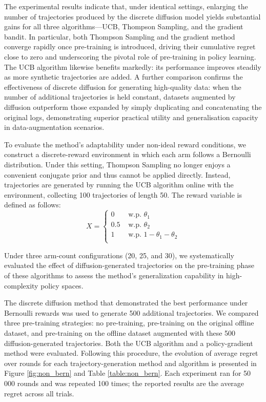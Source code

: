 

The experimental results indicate that, under identical settings, enlarging the number of trajectories produced by the discrete diffusion model yields substantial gains for all three algorithms—UCB, Thompson Sampling, and the gradient bandit. In particular, both Thompson Sampling and the gradient method converge rapidly once pre-training is introduced, driving their cumulative regret close to zero and underscoring the pivotal role of pre-training in policy learning. The UCB algorithm likewise benefits markedly: its performance improves steadily as more synthetic trajectories are added. A further comparison confirms the effectiveness of discrete diffusion for generating high-quality data: when the number of additional trajectories is held constant, datasets augmented by diffusion outperform those expanded by simply duplicating and concatenating the original logs, demonstrating superior practical utility and generalisation capacity in data-augmentation scenarios.


To evaluate the method’s adaptability under non-ideal reward conditions, we construct a discrete-reward environment in which each arm follows a Bernoulli distribution. Under this setting, Thompson Sampling no longer enjoys a convenient conjugate prior and thus cannot be applied directly. Instead, trajectories are generated by running the UCB algorithm online with the environment, collecting 100 trajectories of length 50. The reward variable is defined as follows:
$$X=\begin{cases}
0 & \text{ w.p. } \theta_1 \\
0.5 & \text{ w.p. } \theta_2 \\
1 & \text{ w.p. } 1-\theta_1-\theta_2 \\
\end{cases}$$

Under three arm-count configurations (20, 25, and 30), we systematically evaluated the effect of diffusion-generated trajectories on the pre-training phase of these algorithms to assess the method’s generalization capability in high-complexity policy spaces.

The discrete diffusion method that demonstrated the best performance under Bernoulli rewards was used to generate 500 additional trajectories. We compared three pre-training strategies: no pre-training, pre-training on the original offline dataset, and pre-training on the offline dataset augmented with these 500 diffusion-generated trajectories. Both the UCB algorithm and a policy-gradient method were evaluated. Following this procedure, the evolution of average regret over rounds for each trajectory-generation method and algorithm is presented in Figure \ref{fig:non_bern} and Table \ref{table:non_bern}. Each experiment ran for 50 000 rounds and was repeated 100 times; the reported results are the average regret across all trials.

